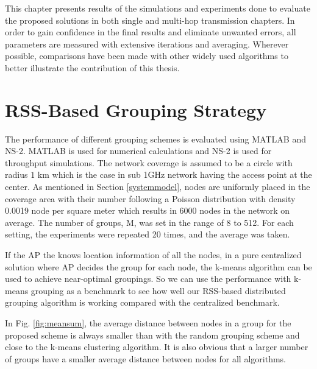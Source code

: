 \label{chapter:eval}
This chapter presents results of the simulations and experiments done to evaluate the proposed solutions in both single and multi-hop transmission chapters. In order to gain confidence in the final results and eliminate unwanted errors, all parameters are measured with extensive iterations and averaging. Wherever possible, comparisons have been made with other widely used algorithms to better illustrate the contribution of this thesis. 

\section{RSS-Based Grouping Strategy}


The performance of different grouping schemes is evaluated using MATLAB and NS-2\cite{breslau2000advances}. MATLAB is used for numerical calculations and NS-2 is used for throughput simulations. The network coverage is assumed to be a circle with radius $1$ km which is the case in sub 1GHz network having the access point at the center. As mentioned in Section \ref{systemmodel}, nodes are uniformly placed in the coverage area with their number following a Poisson distribution with density 0.0019 node per square meter which results in 6000 nodes in the network on average. The number of groups, M, was set in the range of 8 to 512. For each setting, the experiments were repeated 20 times, and the average was taken. 



If the AP the knows location information of all the nodes, in a pure centralized solution where AP decides the group for each node, the k-means algorithm can be used to achieve near-optimal groupings. So we can use the performance with k-means grouping as a benchmark to see how well our RSS-based distributed grouping algorithm is working compared with the centralized benchmark.

In Fig. \ref{fig:meansum}, the average distance between nodes in a group for the proposed scheme is always smaller than with the random grouping scheme and close to the k-means clustering algorithm. It is also obvious that a larger number of groups have a smaller average distance between nodes for all algorithms. 

